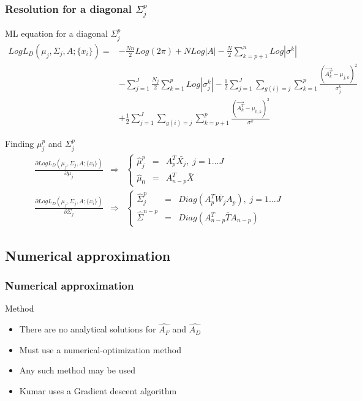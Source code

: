 \documentclass[smaller,pdf,svgnames]{beamer}
\begin{document}
\begin{frame}
  \frametitle{Resolution for a diagonal $\Sigma_j^p$}

  \begin{block}{ML equation for a diagonal $\Sigma_j^p$}
    $$
    \begin{array}{cl}
      Log L_D(\mu_j, \Sigma_j, A; \{x_i\}) = & -\frac{N n}{2} Log (2\pi) + N Log|A| - \frac{N}{2}\sum\limits_{k = p + 1}^n Log|\sigma^k| \\
      & - \sum\limits_{j = 1}^J \frac{N_j}{2} \sum\limits_{k = 1}^p Log|\sigma_j^k| - \frac{1}{2}\sum\limits_{j = 1}^J\sum\limits_{g(i) = j}
      \sum\limits_{k = 1}^p \frac{(\vec{A_k^T} - \mu_{j,k})^2}{\sigma_j^k} \\
      & + \frac{1}{2}\sum\limits_{j = 1}^J\sum\limits_{g(i) = j}
      \sum\limits_{k = p + 1}^p \frac{(\vec{A_k^T} - \mu_{0,k})^2}{\sigma^k}
    \end{array}
    $$
  \end{block}

  \begin{block}{Finding $\mu_j^p$ and $\Sigma_j^p$}
    $$
    \begin{array}{ccl}
      \frac{\partial Log L_D(\mu_j, \Sigma_j, A; \{x_i\})}{\partial \mu_j} & \Rightarrow & \left \{
        \begin{array}{ccl}
          \hat\mu_j^p & = & A_p^T\bar{X_j} ,\; j = 1...J\\
          \hat\mu_0 & = & A_{n - p}^T\bar{X}
        \end{array}
      \right . \\
      \frac{\partial Log L_D(\mu_j, \Sigma_j, A; \{x_i\})}{\partial \Sigma_j} & \Rightarrow & \left \{
        \begin{array}{ccl}
          \hat\Sigma_j^p & = & Diag(A_p^T\bar{W_j}A_p), \; j = 1...J\\
          \hat\Sigma^{n - p} & = & Diag(A_{n - p}^T\bar{T}A_{n - p})
        \end{array}
      \right .
    \end{array}
    $$
  \end{block}
\end{frame}

\subsection{Numerical approximation}

\begin{frame}
  \frametitle{Numerical approximation}

  \begin{block}{Method}
    \begin{itemize}
      \item There are no analytical solutions for $\hat{A_F}$ and $\hat{A_D}$
      \item Must use a numerical-optimization method
      \item Any such method may be used
      \item Kumar\cite{kumar.1997} uses a Gradient descent algorithm
    \end{itemize}
  \end{block}
\end{frame}
\end{document}
